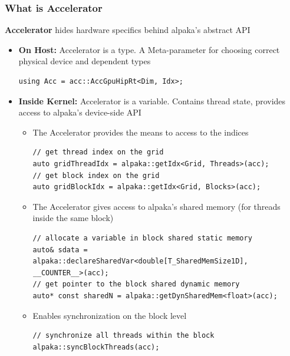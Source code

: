 \documentclass[9pt]{beamer}
\begin{document}
\begin{frame} [fragile]
\frametitle{What is Accelerator}
\textbf{Accelerator} hides hardware specifics behind alpaka’s abstract API
\lstset{basicstyle=\ttfamily\scriptsize}
\begin{itemize}
\item \textbf{On Host:} Accelerator is a type. A Meta-parameter for choosing correct physical device and dependent types
\begin{lstlisting}
using Acc = acc::AccGpuHipRt<Dim, Idx>;
 \end{lstlisting}
\item \textbf{Inside Kernel:} Accelerator is a variable. Contains thread state, provides access to alpaka’s device-side API
\begin{itemize}
\item The Accelerator provides the means to access to the indices
 \begin{lstlisting}
// get thread index on the grid
auto gridThreadIdx = alpaka::getIdx<Grid, Threads>(acc);
// get block index on the grid
auto gridBlockIdx = alpaka::getIdx<Grid, Blocks>(acc);
 \end{lstlisting}
\item The Accelerator gives access to alpaka’s shared memory (for threads inside the same block)
 \begin{lstlisting}
// allocate a variable in block shared static memory
auto& sdata = alpaka::declareSharedVar<double[T_SharedMemSize1D], __COUNTER__>(acc);
// get pointer to the block shared dynamic memory
auto* const sharedN = alpaka::getDynSharedMem<float>(acc);
 \end{lstlisting}
\item Enables synchronization on the block level
 \begin{lstlisting}
// synchronize all threads within the block
alpaka::syncBlockThreads(acc);
 \end{lstlisting}
\end{itemize}
\end{itemize}

\end{frame}
\end{document}
